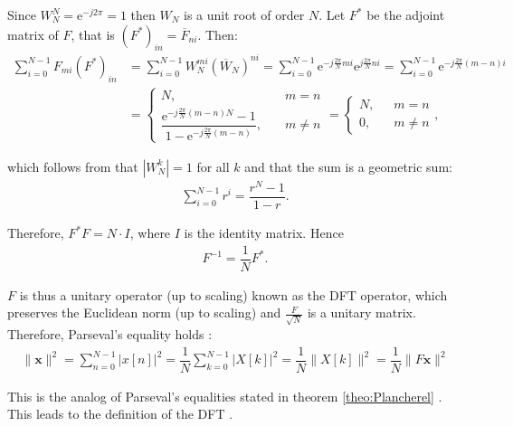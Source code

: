 Since $W_N^N = \text{e}^{-j2\pi} = 1$ then $W_N$ is a unit root of order $N$. Let $F^*$ be the adjoint matrix of $F$, that is $(F^*)_{in} = \overline{F}_{ni}$. Then:
\begin{align*}
\sum_{i=0}^{N-1} F_{mi} (F^*)_{in} &= \sum_{i=0}^{N-1} W_N^{mi} (\overline{W}_N)^{ni} = \sum_{i=0}^{N-1} \text{e}^{-j\frac{2\pi}{N}mi} \text{e}^{j\frac{2\pi}{N}ni} = \sum_{i=0}^{N-1} \text{e}^{-j\frac{2\pi}{N}(m-n)i} \\ &=
\begin{cases}
N, &m = n \\
\dfrac{\text{e}^{-j\frac{2\pi}{N}(m-n)N}-1}{1-\text{e}^{-j\frac{2\pi}{N}(m-n)}}, \quad &m \neq n
\end{cases} =
\begin{cases}
N, &m = n \\
0, \quad &m \neq n
\end{cases},
\end{align*}

which follows from that $|W_N^k| = 1$ for all $k$ and that the sum is a geometric sum:
\begin{align*}
\sum_{i=0}^{N-1} r^i = \dfrac{r^N-1}{1-r}.
\end{align*}

Therefore, $F^*F = N \cdot I$, where $I$ is the identity matrix. Hence
\begin{align*}
F^{-1} = \dfrac{1}{N} F^*.
\end{align*}

$F$ is thus a unitary operator (up to scaling) known as the DFT operator, which preserves the Euclidean norm (up to scaling) and $\frac{F}{\sqrt{N}}$ is a unitary matrix. Therefore, Parseval's equality holds \cite{page 258, FSP}:
\begin{align*}
\|\textbf{x}\|^2 = \sum_{n=0}^{N-1} |x[n]|^2 = \dfrac{1}{N} \sum_{k=0}^{N-1} |X[k]|^2 = \dfrac{1}{N} \|X[k]\|^2 = \dfrac{1}{N} \|F\textbf{x}\|^2
\end{align*}

This is the analog of Parseval's equalities stated in theorem \ref{theo:Plancherel} \cite{page 371, FSP}. This leads to the definition of the DFT \cite{page 253, FSP}.

